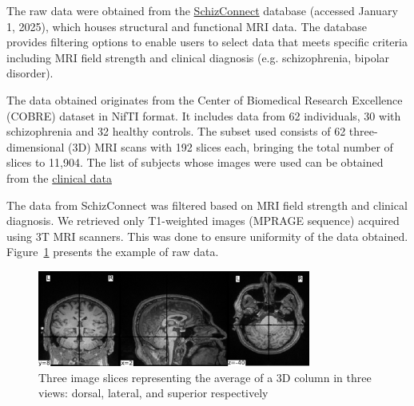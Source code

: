 The raw data were obtained from the \href{http://schizconnect.org}{SchizConnect} database (accessed January 1, 2025), which houses structural and functional MRI data. The database provides filtering options to enable users to select data that meets specific criteria including MRI field strength and clinical diagnosis (e.g. schizophrenia, bipolar disorder).

The data obtained originates from the Center of Biomedical Research Excellence (COBRE) dataset in NifTI format. It includes data from 62 individuals, 30 with schizophrenia and 32 healthy controls. The subset used consists of 62 three-dimensional (3D) MRI scans with 192 slices each, bringing the total number of slices to 11,904. The list of subjects whose images were used can be obtained from the \href{https://github.com/Eager1Beaver/schizo/blob/main/data/clinical_data.csv}{clinical data}

The data from SchizConnect was filtered based on MRI field strength and clinical diagnosis. We retrieved only T1-weighted images (MPRAGE sequence) acquired using 3T MRI scanners. This was done to ensure uniformity of the data obtained. Figure~\ref{fig:raw_mri_volume_slices} presents the example of raw data.
\begin{figure}[h]
    \centering
    \includegraphics[width=0.8\textwidth]{./figs/sample_volume.png} %
    \caption{Three image slices representing the average of a 3D column in three views: dorsal, lateral, and superior respectively}\label{fig:raw_mri_volume_slices}
\end{figure}

